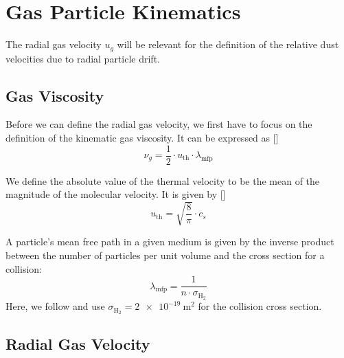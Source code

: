 \clearpage\section{Gas Particle Kinematics}

    The radial gas velocity $u_g$ will be relevant for the definition of the relative dust 
    velocities due to radial particle drift.


    \subsection{Gas Viscosity}

        Before we can define the radial gas velocity, we first have to 
        focus on the definition of the kinematic gas viscosity.
        It can be expressed as []
        \begin{equation}
            \nu_g = \frac{1}{2} \cdot u_\text{th} \cdot \lambda_\text{mfp}
        \end{equation}

        We define the absolute value of the thermal velocity to be the mean of the magnitude
        of the molecular velocity. It is given by []
        \begin{equation}
            u_\text{th} = \sqrt{\frac{8}{\pi}} \cdot c_s
        \end{equation}

        A particle's mean free path in a given medium is given by the inverse product between the 
        number of particles per unit volume and the cross section for a collision:
        \begin{equation}
            \lambda_\text{mfp} = \frac{1}{n \cdot \sigma_{\text{H}_2}}
        \end{equation}
        Here, we follow \cite{birnstiel_dullemond_brauer_2010} and use 
        $\sigma_{\text{H}_2} = \SI{2e-19}{\meter^2}$ for the collision cross section. \\


    \subsection{Radial Gas Velocity}

